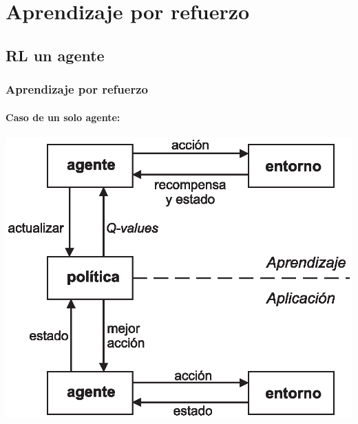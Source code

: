 \documentclass[11pt]{beamer}
\begin{document}
\section{Aprendizaje por refuerzo}
\subsection{RL un agente}
\begin{frame}
\frametitle{Aprendizaje por refuerzo}
\framesubtitle{Caso de un solo agente:}
\begin{center}
\includegraphics[scale=0.55]{./graficas/singleRL2.eps}
\end{center}
\end{frame}
\end{document}
